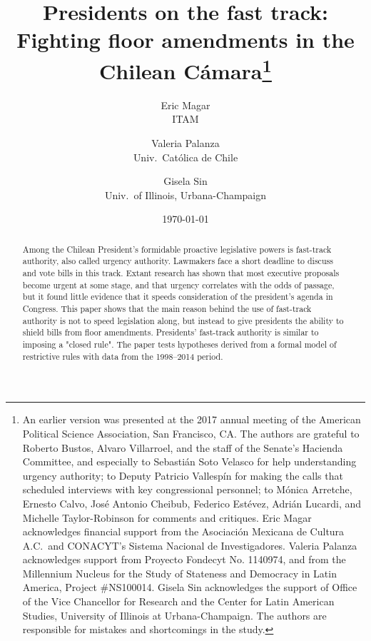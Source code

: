 \documentclass[letter,12pt]{article}
\begin{document}

\title{Presidents on the fast track: Fighting floor amendments in the Chilean Cámara\thanks{An earlier version was presented at the 2017 annual meeting of the American Political Science Association, San Francisco, CA. The authors are grateful to Roberto Bustos, Alvaro Villarroel, and the staff of the Senate's Hacienda Committee, and especially to Sebastián Soto Velasco for help understanding urgency authority; to Deputy Patricio Vallespín for making the calls that scheduled interviews with key congressional personnel; to Mónica Arretche, Ernesto Calvo, José Antonio Cheibub, Federico Estévez, Adrián Lucardi, and Michelle Taylor-Robinson for comments and critiques. Eric Magar acknowledges financial support from the Asociación Mexicana de Cultura A.C.\ and CONACYT's Sistema Nacional de Investigadores. Valeria Palanza acknowledges support from Proyecto Fondecyt No. 1140974, and from the Millennium Nucleus for the Study of Stateness and Democracy in Latin America, Project \#NS100014. Gisela Sin acknowledges the support of Office of the Vice Chancellor for Research and the Center for Latin American Studies, University of Illinois at Urbana-Champaign. The authors are responsible for mistakes and shortcomings in the study.}}
\author{Eric Magar \\ ITAM \and
        Valeria Palanza \\ Univ.\ Católica de Chile \and  
        Gisela Sin \\ Univ.\ of Illinois, Urbana-Champaign 
}
\date{\today}
\maketitle


\begin{abstract}
\noindent Among the Chilean President's formidable proactive legislative powers is fast-track authority, also called urgency authority. Lawmakers face a short deadline to discuss and vote bills in this track. Extant research has shown that most executive proposals become urgent at some stage, and that urgency correlates with the odds of passage, but it found little evidence that it speeds consideration of the president's agenda in Congress. This paper shows that the main reason behind the use of fast-track authority is not to speed legislation along, but instead to give presidents the ability to shield bills from floor amendments. Presidents' fast-track authority is similar to imposing a "closed rule". The paper tests hypotheses derived from a formal model of restrictive rules with data from the 1998--2014 period.
\end{abstract}
\end{document}
